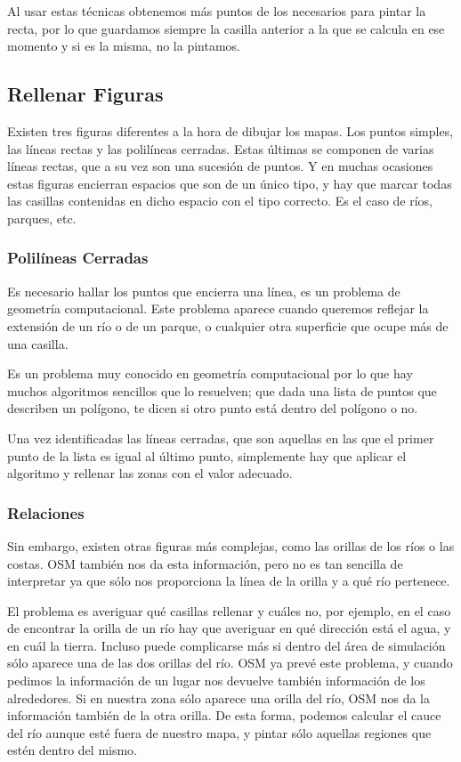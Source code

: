 Al usar estas técnicas obtenemos más puntos de los necesarios para pintar la
recta, por lo que guardamos siempre la casilla anterior a la que se calcula en
ese momento y si es la misma, no la pintamos.

\subsection*{Rellenar Figuras}

Existen tres figuras diferentes a la hora de dibujar los mapas. Los puntos
simples, las líneas rectas y las polilíneas cerradas. Estas últimas se componen
de varias líneas rectas, que a su vez son una sucesión de puntos. Y en muchas
ocasiones estas figuras encierran espacios que son de un único tipo, y hay que
marcar todas las casillas contenidas en dicho espacio con el tipo correcto. Es
el caso de ríos, parques, etc.

\subsubsection*{Polilíneas Cerradas}

Es necesario hallar los puntos que encierra una línea, es un problema de
geometría computacional. Este problema aparece cuando queremos reflejar la
extensión de un río o de un parque, o cualquier otra superficie que ocupe más de
una casilla.

Es un problema muy conocido en geometría computacional por lo que hay muchos
algoritmos sencillos que lo resuelven; que dada una lista de puntos que
describen un polígono, te dicen si otro punto está dentro del polígono o no.

Una vez identificadas las líneas cerradas, que son aquellas en las que el primer
punto de la lista es igual al último punto, simplemente hay que aplicar el
algoritmo y rellenar las zonas con el valor adecuado.

\subsubsection*{Relaciones}

Sin embargo, existen otras figuras más complejas, como las orillas de los ríos
o las costas. OSM también nos da esta información, pero no es tan sencilla de
interpretar ya que sólo nos proporciona la línea de la orilla y a qué río
pertenece.

El problema es averiguar qué casillas rellenar y cuáles no, por ejemplo, en el
caso de encontrar la orilla de un río hay que averiguar en qué dirección está
el agua, y en cuál la tierra. Incluso puede complicarse más si dentro del área
de simulación sólo aparece una de las dos orillas del río. OSM ya prevé este
problema, y cuando pedimos la información de un lugar nos devuelve también
información de los alrededores. Si en nuestra zona sólo aparece una orilla del
río, OSM nos da la información también de la otra orilla. De esta forma, podemos
calcular el cauce del río aunque esté fuera de nuestro mapa, y pintar sólo
aquellas regiones que estén dentro del mismo.

